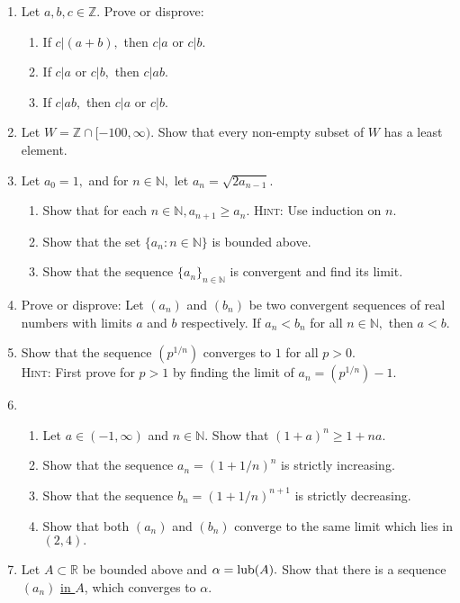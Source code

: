 \begin{enumerate}[label=(\arabic*)]
	\item Let $a, b, c \in \mathbb{Z}.$ Prove or disprove:
	\begin{enumerate}[nosep] 
		\item If $c|(a + b),$ then $c|a$ or $c|b.$
		\item If $c|a$ or $c|b,$ then $c|ab.$
		\item If $c|ab,$ then $c|a$ or $c|b.$
	\end{enumerate}
	\item Let $W = \mathbb{Z} \cap [-100, \infty).$ Show that every non-empty subset of $W$ has a least element.
	\item Let $a_0 = 1,$ and for $n \in \mathbb{N},$ let $a_n = \sqrt{2a_{n-1}}.$
	\begin{enumerate}[nosep] 
	 	\item Show that for each $n \in \mathbb{N}, a_{n+1} \ge a_n.$ \textsc{Hint:} Use induction on $n.$
	 	\item Show that the set $\{a_n:n\in\mathbb{N}\}$ is bounded above.
	 	\item Show that the sequence $\{a_n\}_{n\in\mathbb{N}}$ is convergent and find its limit.
	\end{enumerate} 
	\item Prove or disprove: Let $(a_n)$ and $(b_n)$ be two convergent sequences of real numbers with limits $a$ and $b$ respectively. If $a_n < b_n$ for all $n \in \mathbb{N},$ then $a < b.$
	\item Show that the sequence $(p^{1/n})$ converges to $1$ for all $p > 0.$\\
	\textsc{Hint:} First prove for $p > 1$ by finding the limit of $a_n = (p^{1/n}) - 1.$
	\item %
	\begin{enumerate}[nosep] 
		\item Let $a \in (-1, \infty)$ and $n \in \mathbb{N}.$ Show that $(1 + a)^n \ge 1 + na.$
		\item Show that the sequence $a_n = (1 + 1/n)^n$ is strictly increasing.
		\item Show that the sequence $b_n = (1 + 1/n)^{n+1}$ is strictly decreasing.
		\item Show that both $(a_n)$ and $(b_n)$ converge to the same limit which lies in $(2, 4).$
	\end{enumerate}
	\item Let $A \subset \mathbb{R}$ be bounded above and $\alpha = \operatorname{lub}(A).$ Show that there is a sequence $(a_n)$ \underline{in $A$}, which converges to $\alpha.$

\end{enumerate}
